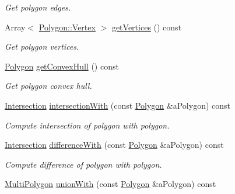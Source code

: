 \begin{DoxyCompactItemize}
\begin{DoxyCompactList}\small\item\em Get polygon edges. \end{DoxyCompactList}\item 
Array$<$ \hyperlink{classostk_1_1math_1_1geom_1_1d2_1_1objects_1_1_polygon_a2fdf6254b42f087bd9cd0b8b0d7df91c}{Polygon\+::\+Vertex} $>$ \hyperlink{classostk_1_1math_1_1geom_1_1d2_1_1objects_1_1_polygon_a04a97204d397a1c7a919ebf4d73fb537}{get\+Vertices} () const
\begin{DoxyCompactList}\small\item\em Get polygon vertices. \end{DoxyCompactList}\item 
\hyperlink{classostk_1_1math_1_1geom_1_1d2_1_1objects_1_1_polygon}{Polygon} \hyperlink{classostk_1_1math_1_1geom_1_1d2_1_1objects_1_1_polygon_a82a1c0d6a76ee136829e0668bdd5c4a6}{get\+Convex\+Hull} () const
\begin{DoxyCompactList}\small\item\em Get polygon convex hull. \end{DoxyCompactList}\item 
\hyperlink{classostk_1_1math_1_1geom_1_1d2_1_1_intersection}{Intersection} \hyperlink{classostk_1_1math_1_1geom_1_1d2_1_1objects_1_1_polygon_a3be4f9a3cca08678f6050cdb8ae31618}{intersection\+With} (const \hyperlink{classostk_1_1math_1_1geom_1_1d2_1_1objects_1_1_polygon}{Polygon} \&a\+Polygon) const
\begin{DoxyCompactList}\small\item\em Compute intersection of polygon with polygon. \end{DoxyCompactList}\item 
\hyperlink{classostk_1_1math_1_1geom_1_1d2_1_1_intersection}{Intersection} \hyperlink{classostk_1_1math_1_1geom_1_1d2_1_1objects_1_1_polygon_aaea6f04037e95bd70e4d6f0524f129e9}{difference\+With} (const \hyperlink{classostk_1_1math_1_1geom_1_1d2_1_1objects_1_1_polygon}{Polygon} \&a\+Polygon) const
\begin{DoxyCompactList}\small\item\em Compute difference of polygon with polygon. \end{DoxyCompactList}\item 
\hyperlink{classostk_1_1math_1_1geom_1_1d2_1_1objects_1_1_multi_polygon}{Multi\+Polygon} \hyperlink{classostk_1_1math_1_1geom_1_1d2_1_1objects_1_1_polygon_ad01feda42e80b74752d3529bc122981b}{union\+With} (const \hyperlink{classostk_1_1math_1_1geom_1_1d2_1_1objects_1_1_polygon}{Polygon} \&a\+Polygon) const

\end{DoxyCompactItemize}
